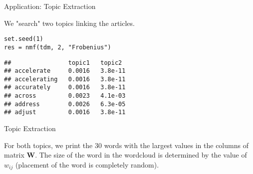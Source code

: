\documentclass[11pt,compress,t,notes=noshow, xcolor=table]{beamer}
\begin{document}
\begin{vbframe}{Application: Topic Extraction}


\framebreak

We "search" two topics linking the articles.
\vspace{0.2cm}

\begin{footnotesize}
\begin{verbatim}
set.seed(1)
res = nmf(tdm, 2, "Frobenius")
\end{verbatim}


\lz
\begin{verbatim}
##                topic1   topic2
## accelerate     0.0016   3.8e-11
## accelerating   0.0016   3.8e-11
## accurately     0.0016   3.8e-11
## across         0.0023   4.1e-03
## address        0.0026   6.3e-05
## adjust         0.0016   3.8e-11
\end{verbatim}
\end{footnotesize}




\normalsize
\end{vbframe}

\begin{vbframe}{Topic Extraction}

For both topics, we print the $30$ words with the largest values in the columns of matrix $\mathbf{W}$. The size of the word in the wordcloud is determined by the value of $w_{ij}$ (placement of the word is completely random).\\

\begin{figure}
	\\
  \end{figure}


\end{vbframe}
\end{document}
